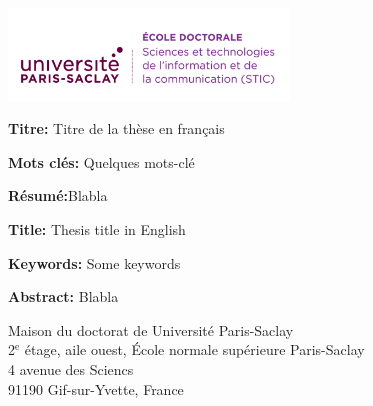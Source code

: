 \documentclass[french,12pt,twoside,a4paper]{book}
\begin{document}
\ifthispageodd{\newpage\thispagestyle{empty}\null\newpage}{}
\thispagestyle{empty}
\selectfont

\lhead{}
\rhead{}
\rfoot{}
\cfoot{}
\lfoot{}

\noindent
\includegraphics[height=2.45cm]{img/EOBE}
\vspace{1cm}
\selectfont

\small

\begin{mdframed}[linecolor=Prune,linewidth=1]

  \textbf{Titre:} Titre de la thèse en français


  \noindent \textbf{Mots clés:} Quelques mots-clé

  \vspace{-.5cm}
  \begin{multicols}{2}
    \noindent \textbf{Résumé:}Blabla
  \end{multicols}

\end{mdframed}

\begin{mdframed}[linecolor=Prune,linewidth=1]

  \textbf{Title:} Thesis title in English

  \noindent \textbf{Keywords:} Some keywords

  \begin{multicols}{2}
    \noindent \textbf{Abstract:} Blabla
  \end{multicols}
\end{mdframed}

\vspace{\fill} %

\noindent
\color{Prune} \footnotesize Maison du doctorat de Université Paris-Saclay\\
2$^{\mathrm{e}}$ étage, aile ouest, École normale supérieure Paris-Saclay\\
4 avenue des Sciencs\\
91190 Gif-sur-Yvette, France
\end{document}
